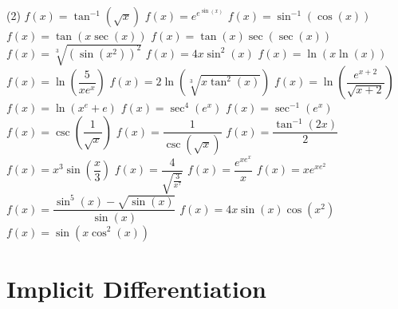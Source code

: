 \documentclass[10pt,oneside,]{book}
\theoremstyle{plain}
\theoremstyle{definition}
\numberwithin{equation}{section}
\newcommand{\fe}[2]{#1\mathopen{}\left(#2\right)\mathclose{}}
\begin{document}
\begin{exercisegroup}(2)
\exercise[16.]\hypertarget{exercise-498}{\null}\(\fe{f}{x}=\fe{\tan^{-1}}{\sqrt{x}}\)%
\exercise[17.]\hypertarget{exercise-499}{\null}\(\fe{f}{x}=e^{e^{\fe{\sin}{x}}}\)%
\exercise[18.]\hypertarget{exercise-500}{\null}\(\fe{f}{x}=\fe{\sin^{-1}}{\fe{\cos}{x}}\)%
\exercise[19.]\hypertarget{exercise-501}{\null}\(\fe{f}{x}=\fe{\tan}{x\fe{\sec}{x}}\)%
\exercise[20.]\hypertarget{exercise-502}{\null}\(\fe{f}{x}=\fe{\tan}{x}\fe{\sec}{\fe{\sec}{x}}\)%
\exercise[21.]\hypertarget{exercise-503}{\null}\(\fe{f}{x}=\sqrt[3]{\left(\fe{\sin}{x^2}\right)^2}\)%
\exercise[22.]\hypertarget{exercise-504}{\null}\(\fe{f}{x}=4x\fe{\sin^2}{x}\)%
\exercise[23.]\hypertarget{exercise-505}{\null}\(\fe{f}{x}=\fe{\ln}{x\fe{\ln}{x}}\)%
\exercise[24.]\hypertarget{exercise-506}{\null}\(\fe{f}{x}=\fe{\ln}{\dfrac{5}{xe^x}}\)%
\exercise[25.]\hypertarget{exercise-507}{\null}\(\fe{f}{x}=2\fe{\ln}{\sqrt[3]{x\fe{\tan^2}{x}}}\)%
\exercise[26.]\hypertarget{exercise-508}{\null}\(\fe{f}{x}=\fe{\ln}{\dfrac{e^{x+2}}{\sqrt{x+2}}}\)%
\exercise[27.]\hypertarget{exercise-509}{\null}\(\fe{f}{x}=\fe{\ln}{x^e+e}\)%
\exercise[28.]\hypertarget{exercise-510}{\null}\(\fe{f}{x}=\fe{\sec^4}{e^x}\)%
\exercise[29.]\hypertarget{exercise-511}{\null}\(\fe{f}{x}=\fe{\sec^{-1}}{e^x}\)%
\exercise[30.]\hypertarget{exercise-512}{\null}\(\fe{f}{x}=\fe{\csc}{\dfrac{1}{\sqrt{x}}}\)%
\exercise[31.]\hypertarget{exercise-513}{\null}\(\fe{f}{x}=\dfrac{1}{\fe{\csc}{\sqrt{x}}}\)%
\exercise[32.]\hypertarget{exercise-514}{\null}\(\fe{f}{x}=\dfrac{\fe{\tan^{-1}}{2x}}{2}\)%
\exercise[33.]\hypertarget{exercise-515}{\null}\(\fe{f}{x}=x^3\fe{\sin}{\dfrac{x}{3}}\)%
\exercise[34.]\hypertarget{exercise-516}{\null}\(\fe{f}{x}=\dfrac{4}{\sqrt{\frac{3}{x^7}}}\)%
\exercise[35.]\hypertarget{exercise-517}{\null}\(\fe{f}{x}=\dfrac{e^{xe^x}}{x}\)%
\exercise[36.]\hypertarget{exercise-518}{\null}\(\fe{f}{x}=xe^{xe^2}\)%
\exercise[37.]\hypertarget{exercise-519}{\null}\(\fe{f}{x}=\dfrac{\fe{\sin^5}{x}-\sqrt{\fe{\sin}{x}}}{\fe{\sin}{x}}\)%
\exercise[38.]\hypertarget{exercise-520}{\null}\(\fe{f}{x}=4x\fe{\sin}{x}\fe{\cos}{x^2}\)%
\exercise[39.]\hypertarget{exercise-521}{\null}\(\fe{f}{x}=\fe{\sin}{x\fe{\cos^2}{x}}\)%
\end{exercisegroup}
\par\smallskip\noindent
\typeout{************************************************}
\typeout{************************************************}
\chapter[Implicit Differentiation]{Implicit Differentiation}\label{chapter-implicit-differentiation}
\typeout{************************************************}
\typeout{************************************************}
\end{document}
